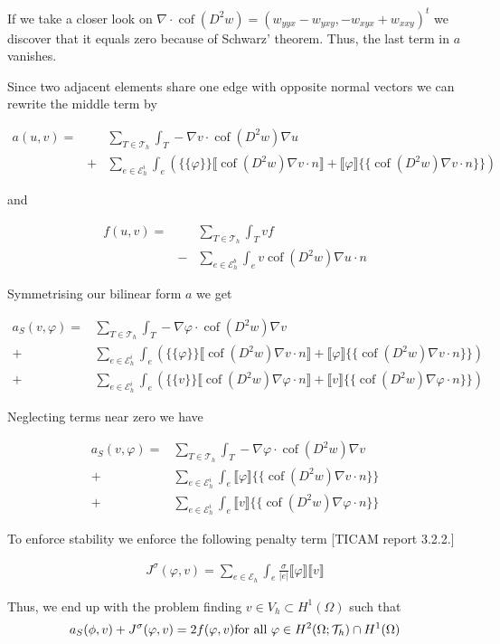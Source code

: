 \documentclass[a4paper,11pt]{article}
\newcommand{\myint}{\displaystyle\int}
\newcommand{\cof}{\operatorname{cof}}
\newcommand{\edges}{\mathcal{E}_h}
\newcommand{\edgesi}{\mathcal{E}_h^i}
\newcommand{\edgesb}{\mathcal{E}_h^b}
\newcommand{\triang}{\mathcal{T}_h}
\begin{document}
If we take a closer look on $\nabla \cdot \cof(D^2 w) = \left( w_{yyx}-w_{yxy}, -w_{xyx} + w_{xxy} \right)^t$ we discover that it equals zero because of Schwarz' theorem. Thus, the last term in $a$ vanishes.

Since two adjacent elements share one edge with opposite normal vectors we can rewrite the middle term by

\begin{eqnarray*}
 a(u,v) = & &\sum\limits_{T \in \triang} \myint_T -\nabla v \cdot \cof(D^2 w) \nabla u \\
	 &+ &\sum\limits_{e \in \edgesi}\myint_{e} \left( \{\{\varphi\}\} \llbracket \cof(D^2 w) \nabla v \cdot n \rrbracket + \llbracket\varphi\rrbracket \{\{ \cof(D^2 w) \nabla v \cdot n \}\} \right)
\end{eqnarray*}

and

\begin{eqnarray*}
	f(u,v) = && \sum\limits_{T \in \triang} \myint_T v f \\
	 				&- &\sum\limits_{e \in \edgesb}\myint_{e} v \cof(D^2 w) \nabla u \cdot n 
\end{eqnarray*} 

Symmetrising our bilinear form $a$ we get

\begin{eqnarray*}
 a_S(v, \varphi) = &\sum\limits_{T \in \triang} \myint_T -\nabla \varphi \cdot \cof(D^2 w) \nabla v \\
 + &\sum\limits_{e \in \edgesi}\myint_{e} \left( \{\{\varphi\}\} \llbracket \cof(D^2 w) \nabla v \cdot n \rrbracket + \llbracket\varphi\rrbracket \{\{ \cof(D^2 w) \nabla v \cdot n \}\} \right)  \\
 +& \sum\limits_{e \in \edgesi}\myint_{e} \left( \{\{v\}\} \llbracket \cof(D^2 w) \nabla \varphi \cdot n \rrbracket + \llbracket v\rrbracket \{\{ \cof(D^2 w) \nabla \varphi \cdot n \}\} \right) 
\end{eqnarray*}

Neglecting terms near zero we have

\begin{eqnarray*}
 a_S(v, \varphi) = &\sum\limits_{T \in \triang} \myint_T -\nabla \varphi \cdot \cof(D^2 w) \nabla v \\
 + &\sum\limits_{e \in \edgesi}\myint_{e} \llbracket\varphi\rrbracket \{\{ \cof(D^2 w) \nabla v \cdot n \}\} \\
 +& \sum\limits_{e \in \edgesi}\myint_{e} \llbracket v\rrbracket \{\{ \cof(D^2 w) \nabla \varphi \cdot n \}\} 
\end{eqnarray*}


To enforce stability we enforce the following penalty term [TICAM report 3.2.2.]

\begin{eqnarray*}
	J^\sigma(\varphi, v) = \sum\limits_{e \in \edges} \myint_e \frac \sigma {|e|} \llbracket \varphi \rrbracket \llbracket v \rrbracket
\end{eqnarray*}

Thus, we end up with the problem finding $v \in V_h \subset H^1(\Omega)$ such that
\[
	a_S(\phi,v) + J^\sigma(\varphi,v) = 2f(\varphi, v) \textnormal{for all } \varphi \in H^2(\Omega; \triang) \cap H^1(\Omega) 
\] 
\end{document}
